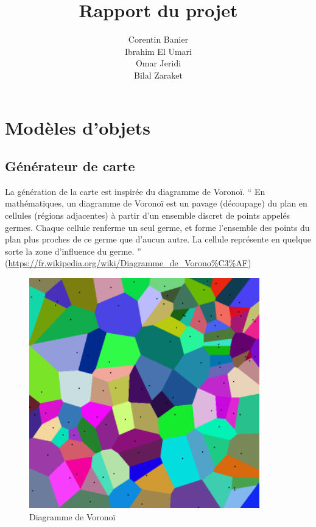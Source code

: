 \documentclass[french,nochapter,11pt]{RapportProjet}
\author{
    Corentin Banier \\
    Ibrahim El Umari \\
    Omar Jeridi \\
    Bilal Zaraket
}
\begin{document}
\title{Rapport du projet}
\subject{\texttt{Dicewars}}
\maketitle

\section{Modèles d'objets}
\subsection{Générateur de carte}
La génération de la carte est inspirée du diagramme de Vorono\"i.\newline
\enquote{
    En mathématiques, un diagramme de Vorono\"i est un pavage (découpage) du plan en cellules (régions adjacentes) 
    à partir d'un ensemble discret de points appelés germes. 
    Chaque cellule renferme un seul germe, et forme l'ensemble des points du plan plus proches de ce germe que d'aucun autre. 
    La cellule représente en quelque sorte la zone d'influence du germe.
} (\url{https://fr.wikipedia.org/wiki/Diagramme_de_Vorono%C3%AF})

\begin{figure}[ht]
    \centering
    \includegraphics[width=10cm]{img/Coloured_Voronoi_2D.png}
    \caption{Diagramme de Vorono\"i}
    \label{fig:diagVoro}
\end{figure}
\end{document}
